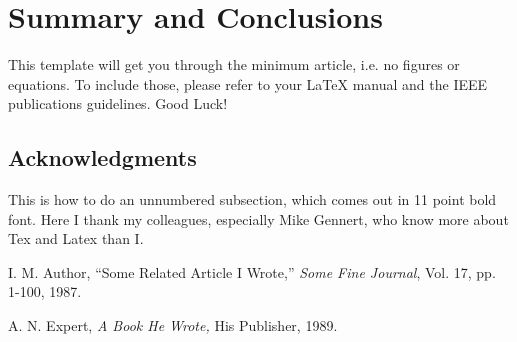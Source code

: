 \section{Summary and Conclusions}
This template will get you through the minimum article, 
i.e. no figures or equations.  To include those, please 
refer to your LaTeX manual and the IEEE publications 
guidelines.  Good Luck!

\subsection*{Acknowledgments}
This is how to do an unnumbered subsection, which comes 
out in 11 point bold font.  Here I thank my colleagues, 
especially Mike Gennert, who know more about Tex and 
Latex than I.

	\begin{thebibliography}{9}
	
		I. M. Author,
		``Some Related Article I Wrote,''
		{\em Some Fine Journal}, Vol. 17, pp. 1-100, 1987.
		
		A. N. Expert,
		{\em A Book He Wrote,}
		His Publisher, 1989.
	
	\end{thebibliography}




